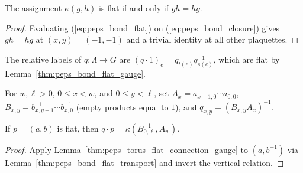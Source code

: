 \begin{lemma}%
    \label{thm:peps_bond_closure_flat}
    \leanok
    The assignment $\kappa(g,h)$ is flat if and only if $gh=hg$.
\end{lemma}
\begin{proof}\leanok
    Evaluating (\ref{eq:peps_bond_flat}) on (\ref{eq:peps_bond_closure}) gives $gh=hg$ at $(x,y)=(-1,-1)$ and a trivial identity at all other plaquettes.
\end{proof}

\begin{definition}%
    \label{def:peps_bond_relative}
    \leanok
    The relative labels of $q:\Lambda\to G$ are $(q\cdot1)_e=q_{t(e)}q_{s(e)}^{-1}$, which are flat by Lemma~\ref{thm:peps_bond_flat_gauge}.
\end{definition}

\begin{definition}%
    \label{def:peps_bond_tree_gauge}
    \leanok
    For $w,\ell>0$, $0\le x<w$, and $0\le y<\ell$, set $A_x=a_{x-1,0}\cdots a_{0,0}$, $B_{x,y}=b_{x,y-1}^{-1}\cdots b_{x,0}^{-1}$ (empty products equal to $1$), and $q_{x,y}=(B_{x,y}A_x)^{-1}$.
\end{definition}

\begin{lemma}%
    \label{thm:peps_bond_tree_closure}
    \leanok
    If $p=(a,b)$ is flat, then $q\cdot p=\kappa(B_{0,\ell}^{-1},A_w)$.
\end{lemma}
\begin{proof}\leanok
    Apply Lemma~\ref{thm:peps_torus_flat_connection_gauge} to $(a,b^{-1})$ via Lemma~\ref{thm:peps_bond_flat_transport} and invert the vertical relation.
\end{proof}


